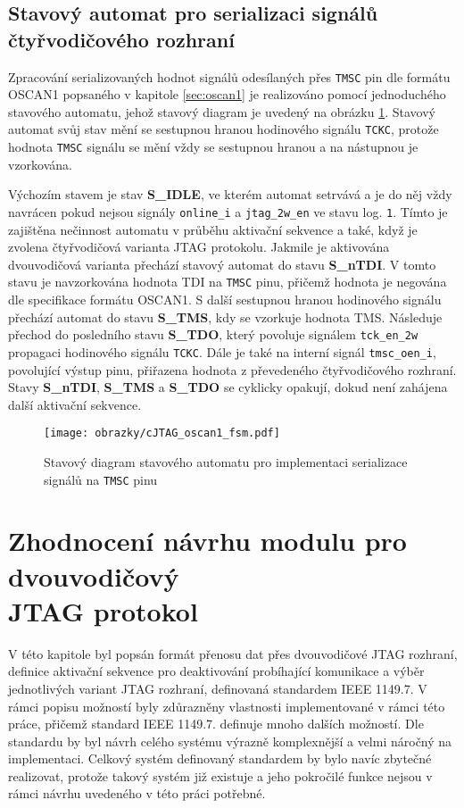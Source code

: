 \subsection{Stavový automat pro serializaci signálů čtyřvodičového rozhraní}	\label{subsec:oscan1_fsm}
Zpracování serializovaných hodnot signálů odesílaných přes \texttt{\acs{TMSC}} pin dle formátu OSCAN1 popsaného v kapitole \ref{sec:oscan1} je realizováno pomocí jednoduchého stavového automatu, jehož stavový diagram je uvedený na obrázku \ref{fig:cJTAG_oscan1_fsm}. Stavový automat svůj stav mění se sestupnou hranou hodinového signálu \texttt{\acs{TCKC}}, protože hodnota \texttt{\acs{TMSC}} signálu se mění vždy se sestupnou hranou a na nástupnou je vzorkována.

Výchozím stavem je stav \textbf{S\_IDLE}, ve kterém automat setrvává a je do něj vždy navrácen pokud nejsou signály \texttt{online\_i} a \texttt{jtag\_2w\_en} ve stavu log. \texttt{1}. Tímto je zajištěna nečinnost automatu v průběhu aktivační sekvence a také, když je zvolena čtyřvodičová varianta \acs{JTAG} protokolu. Jakmile je aktivována dvouvodičová varianta přechází stavový automat do stavu \textbf{S\_nTDI}. V tomto stavu je navzorkována hodnota TDI na \texttt{\acs{TMSC}} pinu, přičemž hodnota je negována dle specifikace formátu OSCAN1. S další sestupnou hranou hodinového signálu přechází automat do stavu \textbf{S\_TMS}, kdy se vzorkuje hodnota TMS. Následuje přechod do posledního stavu \textbf{S\_TDO}, který povoluje signálem \texttt{tck\_en\_2w} propagaci hodinového signálu \texttt{\acs{TCKC}}. Dále je také na interní signál \texttt{tmsc\_oen\_i}, povolující výstup pinu, přiřazena hodnota z převedeného čtyřvodičového rozhraní. Stavy \textbf{S\_nTDI}, \textbf{S\_TMS} a \textbf{S\_TDO} se cyklicky opakují, dokud není zahájena další aktivační sekvence.

\begin{figure}[!h]
  \begin{center}
    \texttt{[image: obrazky/cJTAG\_oscan1\_fsm.pdf]}
  \end{center}
  \caption{Stavový diagram stavového automatu pro implementaci serializace signálů na \texttt{\acs{TMSC}} pinu}
	\label{fig:cJTAG_oscan1_fsm}
\end{figure}

\section{Zhodnocení návrhu modulu pro dvouvodičový\\ \acs{JTAG} protokol}
V této kapitole byl popsán formát přenosu dat přes dvouvodičové \acs{JTAG} rozhraní, definice aktivační sekvence pro deaktivování probíhající komunikace a výběr jednotlivých variant \acs{JTAG} rozhraní, definovaná standardem IEEE 1149.7. V rámci popisu možností byly zdůrazněny vlastnosti implementované v rámci této práce, přičemž standard IEEE 1149.7. definuje mnoho dalších možností. Dle standardu by byl návrh celého systému výrazně komplexnější a velmi náročný na implementaci. Celkový systém definovaný standardem by bylo navíc zbytečné realizovat, protože takový systém již existuje a jeho pokročilé funkce nejsou v rámci návrhu uvedeného v této práci potřebné.

